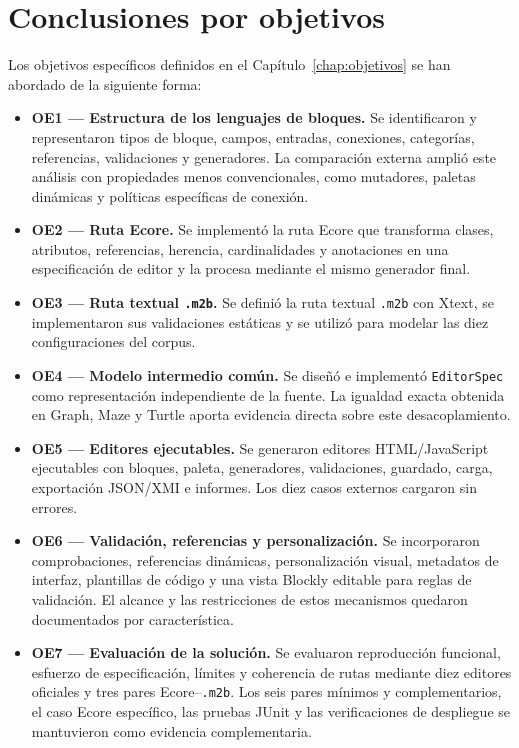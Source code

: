 \section{Conclusiones por objetivos}
\label{sec:conclusiones-objetivos}

Los objetivos específicos definidos en el Capítulo~\ref{chap:objetivos} se han
abordado de la siguiente forma:

\begin{itemize}
  \item \textbf{OE1 --- Estructura de los lenguajes de bloques.} Se identificaron y representaron tipos de bloque, campos,
  entradas, conexiones, categorías, referencias, validaciones y generadores. La
  comparación externa amplió este análisis con propiedades menos convencionales,
  como mutadores, paletas dinámicas y políticas específicas de conexión.
  \item \textbf{OE2 --- Ruta Ecore.} Se implementó la ruta Ecore que transforma clases,
  atributos, referencias, herencia, cardinalidades y anotaciones en una
  especificación de editor y la procesa mediante el mismo generador final.
  \item \textbf{OE3 --- Ruta textual \texttt{.m2b}.} Se definió la ruta textual \texttt{.m2b} con Xtext, se
  implementaron sus validaciones estáticas y se utilizó para modelar las diez
  configuraciones del corpus.
  \item \textbf{OE4 --- Modelo intermedio común.} Se diseñó e implementó \texttt{EditorSpec} como
  representación independiente de la fuente. La igualdad exacta obtenida en
  Graph, Maze y Turtle aporta evidencia directa sobre este desacoplamiento.
  \item \textbf{OE5 --- Editores ejecutables.} Se generaron editores HTML/JavaScript ejecutables con
  bloques, paleta, generadores, validaciones, guardado, carga, exportación
  JSON/XMI e informes. Los diez casos externos cargaron sin errores.
  \item \textbf{OE6 --- Validación, referencias y personalización.} Se incorporaron comprobaciones, referencias dinámicas,
  personalización visual, metadatos de interfaz, plantillas de código y una
  vista Blockly editable para reglas de validación. El alcance y las
  restricciones de estos mecanismos quedaron documentados por característica.
  \item \textbf{OE7 --- Evaluación de la solución.} Se evaluaron reproducción funcional, esfuerzo de
  especificación, límites y coherencia de rutas mediante diez editores
  oficiales y tres pares Ecore--\texttt{.m2b}. Los seis pares mínimos y
  complementarios, el caso Ecore específico, las pruebas JUnit y las
  verificaciones de despliegue se mantuvieron como evidencia complementaria.
\end{itemize}

